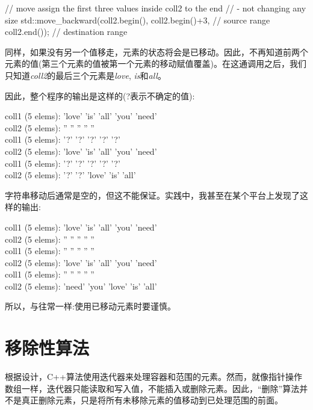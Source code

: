 \begin{codebox}[cpp]
// move assign the first three values inside coll2 to the end
// - not changing any size
std::move_backward(coll2.begin(), coll2.begin()+3, // source range
           coll2.end()); // destination range
\end{codebox}

同样，如果没有另一个值移走，元素的状态将会是已移动。因此，不再知道前两个元素的值(第三个元素的值被第一个元素的移动赋值覆盖)。在这通调用之后，我们只知道\textit{coll2}的最后三个元素是\textit{love}, \textit{is}和\textit{all}。\par

因此，整个程序的输出是这样的(?表示不确定的值):\par

\begin{myOutput}
  coll1 (5 elems): 'love' 'is' 'all' 'you' 'need' \\
  coll2 (5 elems): '' '' '' '' '' \\
  coll1 (5 elems): '?' '?' '?' '?' '?' \\
  coll2 (5 elems): 'love' 'is' 'all' 'you' 'need' \\
  coll1 (5 elems): '?' '?' '?' '?' '?' \\
  coll2 (5 elems): '?' '?' 'love' 'is' 'all'
\end{myOutput}

字符串移动后通常是空的，但这不能保证。实践中，我甚至在某个平台上发现了这样的输出:\par

\begin{myOutput}
  coll1 (5 elems): 'love' 'is' 'all' 'you' 'need' \\
  coll2 (5 elems): '' '' '' '' '' \\
  coll1 (5 elems): '' '' '' '' '' \\
  coll2 (5 elems): 'love' 'is' 'all' 'you' 'need' \\
  coll1 (5 elems): '' '' '' '' '' \\
  coll2 (5 elems): 'need' 'you' 'love' 'is' 'all'
\end{myOutput}

所以，与往常一样:使用已移动元素时要谨慎。\par


\section{移除性算法}

根据设计，C++算法使用迭代器来处理容器和范围的元素。然而，就像指针操作数组一样，迭代器只能读取和写入值，不能插入或删除元素。因此，“删除”算法并不是真正删除元素，只是将所有未移除元素的值移动到已处理范围的前面。\par

